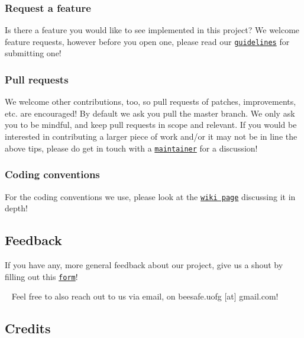 \subsubsection*{Request a feature}

Is there a feature you would like to see implemented in this project? We welcome feature requests, however before you open one, please read our \href{https://github.com/itsBelinda/ENG5220-2020-Team13/blob/master/.github/ISSUE_TEMPLATE/feature_request.md}{\tt guidelines} for submitting one!

\subsubsection*{Pull requests}

We welcome other contributions, too, so pull requests of patches, improvements, etc. are encouraged! By default we ask you pull the {\ttfamily master} branch. We only ask you to be mindful, and keep pull requests in scope and relevant. If you would be interested in contributing a larger piece of work and/or it may not be in line the above tips, please do get in touch with a \href{https://github.com/itsBelinda/ENG5220-2020-Team13/blob/master/README.md#credits}{\tt maintainer} for a discussion!

\subsubsection*{Coding conventions}

For the coding conventions we use, please look at the \href{https://github.com/itsBelinda/ENG5220-2020-Team13/wiki/Contributions#coding-conventions}{\tt wiki page} discussing it in depth!

\subsection*{Feedback}

If you have any, more general feedback about our project, give us a shout by filling out this \href{https://forms.gle/tGHM2jB7GBWfdgk3A}{\tt form}!

~\newline
 Feel free to also reach out to us via email, on beesafe.\+uofg \mbox{[}at\mbox{]} gmail.\+com!

\subsection*{Credits}

